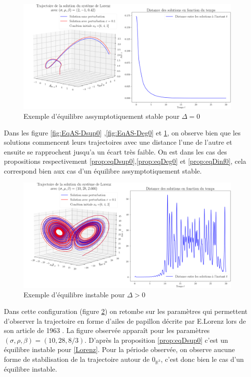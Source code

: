 \documentclass{article}
\newcommand{\R}{\mathbb{R}}
\newtheorem[M , nocut]{prop}{Proposition}[section]
\newtheorem[M , nocut]{definition}{Définition}
\newtheorem[M , nocut]{lemme}{Lemme}
\newtheorem[L , nocut]{thm}{Théoreme}
\newtheorem[M , nocut]{cor}{Corollaire}
\begin{document}
\begin{figure}[!ht]
    \label{fig:eqAS-Dinf0}
    \centering
    \includegraphics[width = \textwidth]{EqAS-Dinf0}
    \caption{Exemple d'équilibre assymptotiquement stable pour $\Delta=0$}
\end{figure}
Dans les figure \ref{fig:EqAS-Dsup0} ,\ref{fig:EqAS-Deg0} et \ref{fig:eqAS-Dinf0}, on observe bien que les solutions commencent leurs trajectoires avec une distance l'une de l'autre et ensuite se rapprochent jusqu'a un écart très faible. On est dans les cas des propositions respectivement \ref{prop:eqDsup0},\ref{prop:eqDeg0} et \ref{prop:eqDinf0}, cela correspond bien aux cas d'un équilibre assymptotiquement stable.

\begin{figure}[!ht]
    \centering
    \includegraphics[width = \textwidth]{EqINS-Dsup0}
    \caption{Exemple d'équilibre instable pour $\Delta>0$}
    \label{fig:EqINS-Dsup0}
\end{figure}
Dans cette configuration (figure \ref{fig:EqINS-Dsup0}) on retombe sur les paramètres qui permettent d'observer la trajectoire en forme d'ailes de papillon décrite par E.Lorenz lors de son article de 1963 \cite{edward_n_lorenz_deterministic_1963}. La figure observée apparaît pour les paramètres $(\sigma,\rho,\beta) = (10,28,8/3)$. D'après la proposition \ref{prop:eqDsup0} c'est un équilibre instable pour \eqref{Lorenz}. Pour la période observée, on observe aucune forme de stabilisation de la trajectoire autour de $0_{\R^3}$, c'est donc bien le cas d'un équilibre instable.
\end{document}
